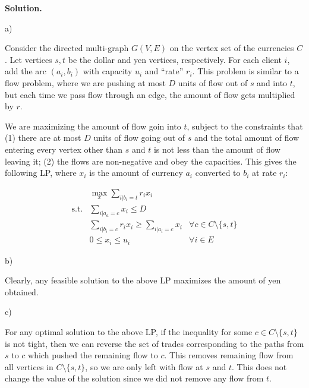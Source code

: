 \documentclass[11pt,letterpaper]{article}
\theoremstyle{definition}
\newcommand{\solution}{\medskip\noindent\textbf{Solution.}\par\medskip}
\begin{document}
\solution

a)

Consider the directed multi-graph $G(V,E)$ on the vertex set of the currencies $C$.
Let vertices $s,t$ be the dollar and yen vertices, respectively.
For each client $i$, add the arc $(a_i,b_i)$ with capacity $u_i$ and ``rate'' $r_i$.
This problem is similar to a flow problem, where we are pushing at most $D$ units of flow out of $s$ and into $t$, but each time we pass flow through an edge, the amount of flow gets multiplied by $r$.

We are maximizing the amount of flow goin into $t$, subject to the constraints that (1) there are at most $D$ units of flow going out of $s$ and the total amount of flow entering every vertex other than $s$ and $t$ is not less than the amount of flow leaving it; 
(2) the flows are non-negative and obey the capacities. This gives the following LP, where $x_i$ is the amount of currency $a_i$ converted to $b_i$ at rate $r_i$:

\begin{align*}
    &\max_x \sum_{i|b_i=t} r_i x_i\\
    \mathrm{s.t.} & \sum_{i|a_a = c} x_i \leq D \\
    &\sum_{i|b_i = c} r_ix_i \geq \sum_{i|a_i=c} x_i &\forall c\in C\setminus\{s,t\}\\
    &0\leq x_i\leq u_i &\forall i\in E
\end{align*}

b)

Clearly, any feasible solution to the above LP maximizes the amount of yen obtained.

c)

For any optimal solution to the above LP, if the inequality for some $c\in C\setminus\{s,t\}$ is not tight, then we can reverse the set of trades corresponding to the paths from $s$ to $c$ which pushed the remaining flow to $c$.
This removes remaining flow from all vertices in $C\setminus\{s,t\}$, so we are only left with flow at $s$ and $t$. 
This does not change the value of the solution since we did not remove any flow from $t$.
\end{document}
